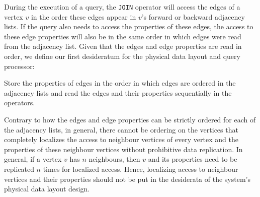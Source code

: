 \begin{guideline}
	\label{ssec:edges-ordered}
	During the execution of a query, the \texttt{JOIN} operator will access the edges of a vertex $v$ in the order these edges appear in $v$'s forward or backward adjacency lists. If the query also needs to access the properties of these edges, the access to these edge properties will also be in the same order in which edges were read from the adjacency list. Given that the edges and edge properties are read in order, we define our first desideratum for the physical data layout and query processor:
	
	\begin{desideratum}
		\label{des1}
		Store the properties of edges in the order in which edges are ordered in the adjacency lists and read the edges and their properties sequentially in the operators.
	\end{desideratum}
	
\end{guideline}

\begin{guideline}
	\label{gdln:vertices-unordered}
	Contrary to how the edges and edge properties can be strictly ordered for each of the adjacency lists, in general, there cannot be ordering on the vertices that completely localizes the access to neighbour vertices of every vertex and the properties of these neighbour vertices without prohibitive data replication. In general, if a vertex $v$ has $n$ neighbours, then $v$ and its properties need to be replicated $n$ times for localized access. Hence, localizing access to neighbour vertices and their properties should not be put in the desiderata of the system's physical data layout design. 	
\end{guideline}

